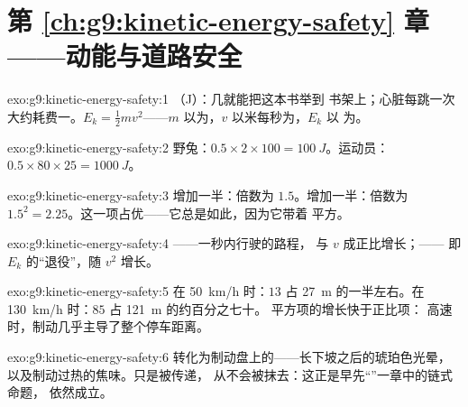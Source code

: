 \section*{第 \ref{ch:g9:kinetic-energy-safety} 章——动能与道路安全}

\begin{solution}{exo:g9:kinetic-energy-safety:1}
（\unit{J}）：几就能把这本书举到
书架上；心脏每跳一次大约耗费一。$E_k = \frac12 m
v^2$——$m$ 以为，$v$ 以米每秒为，$E_k$ 以
为。
\end{solution}

\begin{solution}{exo:g9:kinetic-energy-safety:2}
野兔：$0.5 \times 2 \times 100 = \qty{100}{J}$。运动员：$0.5
\times 80 \times 25 = \qty{1000}{J}$。
\end{solution}

\begin{solution}{exo:g9:kinetic-energy-safety:3}
增加一半：倍数为 $1.5$。增加一半：倍数为 $1.5^2
= 2.25$。这一项占优——它总是如此，因为它带着
平方。
\end{solution}

\begin{solution}{exo:g9:kinetic-energy-safety:4}
——一秒内行驶的路程，
与 $v$ 成正比增长；——
即 $E_k$ 的“退役”，随 $v^2$ 增长。
\end{solution}

\begin{solution}{exo:g9:kinetic-energy-safety:5}
在 \qty{50}{km/h} 时：$13$ 占 \qty{27}{m} 的一半左右。在
\qty{130}{km/h} 时：$85$ 占 \qty{121}{m} 的约百分之七十。
平方项的增长快于正比项：
高速时，制动几乎主导了整个停车距离。
\end{solution}

\begin{solution}{exo:g9:kinetic-energy-safety:6}
转化为制动盘上的——长下坡之后的琥珀色光晕，
以及制动过热的焦味。只是被传递，
从不会被抹去：这正是早先“”一章中的链式命题，
依然成立。
\end{solution}

